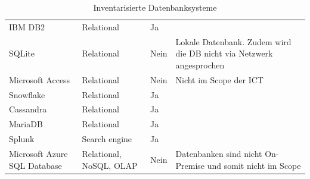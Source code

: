 \begin{landscape}
\begin{table}[]
{\begin{tabular}{@{}llll@{}}
\Gls{IBM DB2}                      & Relational               & Ja                      &                                                                               \\
\Gls{SQLite}                       & Relational               & Nein                    & Lokale Datenbank. Zudem wird die DB nicht via Netzwerk angesprochen           \\
\Gls{Microsoft Access}             & Relational               & Nein                    & Nicht im Scope der ICT                                                        \\
\Gls{Snowflake}                    & Relational               & Ja                      &                                                                               \\
\Gls{Cassandra}                    & Relational               & Ja                      &                                                                               \\
\Gls{MariaDB}                      & Relational               & Ja                      &                                                                               \\
\Gls{Splunk}                       & Search engine            & Ja                      &                                                                               \\
\Gls{Microsoft Azure SQL Database} & Relational, \Gls{NoSQL}, \Gls{OLAP}  & Nein                    & Datenbanken sind nicht On-Premise und somit nicht im Scope                    \\ \bottomrule
\end{tabular}%
}
\caption{Inventarisierte Datenbanksysteme}
\label{tab:Inventarisierte Datenbanksysteme}
\end{table}
\end{landscape}

